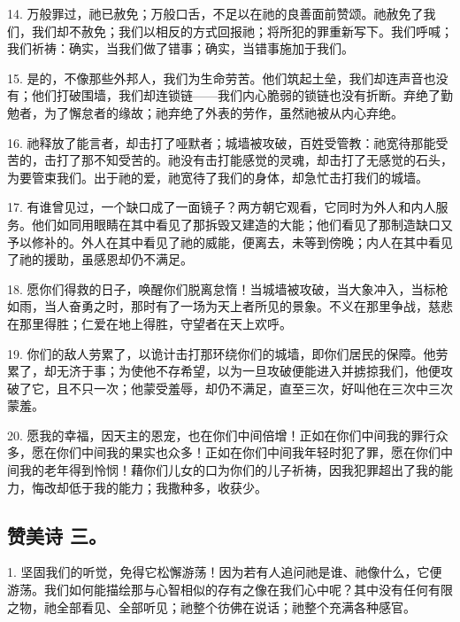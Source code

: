 14. 万般罪过，祂已赦免；万般口舌，不足以在祂的良善面前赞颂。祂赦免了我们，我们却不赦免；我们以相反的方式回报祂；将所犯的罪重新写下。我们呼喊；我们祈祷：确实，当我们做了错事；确实，当错事施加于我们。\par

15. 是的，不像那些外邦人，我们为生命劳苦。他们筑起土垒，我们却连声音也没有；他们打破围墙，我们却连锁链——我们内心脆弱的锁链也没有折断。弃绝了勤勉者，为了懈怠者的缘故；祂弃绝了外表的劳作，虽然祂被从内心弃绝。\par

16. 祂释放了能言者，却击打了哑默者；城墙被攻破，百姓受管教：祂宽待那能受苦的，击打了那不知受苦的。祂没有击打能感觉的灵魂，却击打了无感觉的石头，为要管束我们。出于祂的爱，祂宽待了我们的身体，却急忙击打我们的城墙。\par

17. 有谁曾见过，一个缺口成了一面镜子？两方朝它观看，它同时为外人和内人服务。他们如同用眼睛在其中看见了那拆毁又建造的大能；他们看见了那制造缺口又予以修补的。外人在其中看见了祂的威能，便离去，未等到傍晚；内人在其中看见了祂的援助，虽感恩却仍不满足。\par

18. 愿你们得救的日子，唤醒你们脱离怠惰！当城墙被攻破，当大象冲入，当标枪如雨，当人奋勇之时，那时有了一场为天上者所见的景象。不义在那里争战，慈悲在那里得胜；仁爱在地上得胜，守望者在天上欢呼。\par

19. 你们的敌人劳累了，以诡计击打那环绕你们的城墙，即你们居民的保障。他劳累了，却无济于事；为使他不存希望，以为一旦攻破便能进入并掳掠我们，他便攻破了它，且不只一次；他蒙受羞辱，却仍不满足，直至三次，好叫他在三次中三次蒙羞。\par

20. 愿我的幸福，因天主的恩宠，也在你们中间倍增！正如在你们中间我的罪行众多，愿在你们中间我的果实也众多！正如在你们中间我年轻时犯了罪，愿在你们中间我的老年得到怜悯！藉你们儿女的口为你们的儿子祈祷，因我犯罪超出了我的能力，悔改却低于我的能力；我撒种多，收获少。\par


\subsection{赞美诗 三。}

1. 坚固我们的听觉，免得它松懈游荡！因为若有人追问祂是谁、祂像什么，它便游荡。我们如何能描绘那与心智相似的存有之像在我们心中呢？其中没有任何有限之物，祂全部看见、全部听见；祂整个彷佛在说话；祂整个充满各种感官。\par

